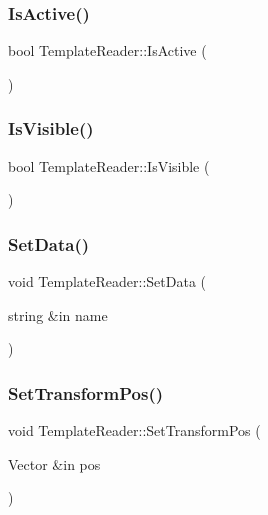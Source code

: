 \subsubsection{\texorpdfstring{Is\+Active()}{IsActive()}}
{\footnotesize\ttfamily bool Template\+Reader\+::\+Is\+Active (\begin{DoxyParamCaption}{ }\end{DoxyParamCaption})}

\hypertarget{class_template_reader_aeadc3cc08487b8381a0574865482af6c}{}\label{class_template_reader_aeadc3cc08487b8381a0574865482af6c} 
\subsubsection{\texorpdfstring{Is\+Visible()}{IsVisible()}}
{\footnotesize\ttfamily bool Template\+Reader\+::\+Is\+Visible (\begin{DoxyParamCaption}{ }\end{DoxyParamCaption})}

\hypertarget{class_template_reader_afa51c2d798afebf1bc300429bb5d3441}{}\label{class_template_reader_afa51c2d798afebf1bc300429bb5d3441} 
\subsubsection{\texorpdfstring{Set\+Data()}{SetData()}}
{\footnotesize\ttfamily void Template\+Reader\+::\+Set\+Data (\begin{DoxyParamCaption}\item[{string \&in}]{name }\end{DoxyParamCaption})}

\hypertarget{class_template_reader_a582b3ed3c87a7d44670101320d18b478}{}\label{class_template_reader_a582b3ed3c87a7d44670101320d18b478} 
\subsubsection{\texorpdfstring{Set\+Transform\+Pos()}{SetTransformPos()}}
{\footnotesize\ttfamily void Template\+Reader\+::\+Set\+Transform\+Pos (\begin{DoxyParamCaption}\item[{Vector \&in}]{pos }\end{DoxyParamCaption})}

